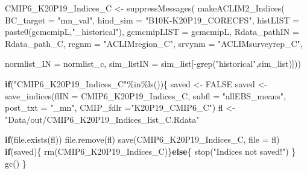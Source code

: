 \documentclass[
]{article}
\newenvironment{Shaded}{\begin{snugshade}}{\end{snugshade}}
\newcommand{\AttributeTok}[1]{\textcolor[rgb]{0.77,0.63,0.00}{#1}}
\newcommand{\ConstantTok}[1]{\textcolor[rgb]{0.00,0.00,0.00}{#1}}
\newcommand{\ControlFlowTok}[1]{\textcolor[rgb]{0.13,0.29,0.53}{\textbf{#1}}}
\newcommand{\FunctionTok}[1]{\textcolor[rgb]{0.00,0.00,0.00}{#1}}
\newcommand{\NormalTok}[1]{#1}
\newcommand{\OtherTok}[1]{\textcolor[rgb]{0.56,0.35,0.01}{#1}}
\newcommand{\SpecialCharTok}[1]{\textcolor[rgb]{0.00,0.00,0.00}{#1}}
\newcommand{\StringTok}[1]{\textcolor[rgb]{0.31,0.60,0.02}{#1}}
\begin{document}
\begin{Shaded}
\begin{Highlighting}[]
    
\NormalTok{     CMIP6\_K20P19\_Indices\_C }\OtherTok{\textless{}{-}} \FunctionTok{suppressMessages}\NormalTok{(}
                        \FunctionTok{makeACLIM2\_Indices}\NormalTok{(}
                        \AttributeTok{BC\_target =} \StringTok{"mn\_val"}\NormalTok{,}
                        \AttributeTok{hind\_sim  =}  \StringTok{"B10K{-}K20P19\_CORECFS"}\NormalTok{,}
                        \AttributeTok{histLIST  =} \FunctionTok{paste0}\NormalTok{(gcmcmipL,}\StringTok{"\_historical"}\NormalTok{),}
                        \AttributeTok{gcmcmipLIST =}\NormalTok{ gcmcmipL,  }
                        \AttributeTok{Rdata\_pathIN =}\NormalTok{ Rdata\_path\_C,}
                        \AttributeTok{regnm    =} \StringTok{"ACLIMregion\_C"}\NormalTok{,}
                        \AttributeTok{srvynm    =} \StringTok{"ACLIMsurveyrep\_C"}\NormalTok{,}
  
                        \AttributeTok{normlist\_IN =}\NormalTok{ normlist\_c,}
                        \AttributeTok{sim\_listIN =}\NormalTok{ sim\_list[}\SpecialCharTok{{-}}\FunctionTok{grep}\NormalTok{(}\StringTok{"historical"}\NormalTok{,sim\_list)]))}
    
     \ControlFlowTok{if}\NormalTok{(}\StringTok{"CMIP6\_K20P19\_Indices\_C"}\SpecialCharTok{\%in\%}\FunctionTok{ls}\NormalTok{())\{                 }
\NormalTok{      saved }\OtherTok{\textless{}{-}} \ConstantTok{FALSE}
\NormalTok{      saved }\OtherTok{\textless{}{-}} \FunctionTok{save\_indices}\NormalTok{(}\AttributeTok{flIN =}\NormalTok{ CMIP6\_K20P19\_Indices\_C, }
                   \AttributeTok{subfl =} \StringTok{"allEBS\_means"}\NormalTok{,}
                   \AttributeTok{post\_txt =} \StringTok{"\_mn"}\NormalTok{,}
                   \AttributeTok{CMIP\_fdlr =}\StringTok{"K20P19\_CMIP6\_C"}\NormalTok{)}
\NormalTok{      fl }\OtherTok{\textless{}{-}} \StringTok{"Data/out/CMIP6\_K20P19\_Indices\_list\_C.Rdata"}
      
      \ControlFlowTok{if}\NormalTok{(}\FunctionTok{file.exists}\NormalTok{(fl)) }\FunctionTok{file.remove}\NormalTok{(fl)}
      \FunctionTok{save}\NormalTok{(CMIP6\_K20P19\_Indices\_C, }\AttributeTok{file =}\NormalTok{ fl)}
       \ControlFlowTok{if}\NormalTok{(saved)\{}
        \FunctionTok{rm}\NormalTok{(CMIP6\_K20P19\_Indices\_C)\}}\ControlFlowTok{else}\NormalTok{\{}
          \FunctionTok{stop}\NormalTok{(}\StringTok{"Indices not saved!"}\NormalTok{)}
\NormalTok{        \}}
      \FunctionTok{gc}\NormalTok{()}
\NormalTok{     \}}
    

\end{Highlighting}
\end{Shaded}
\end{document}
